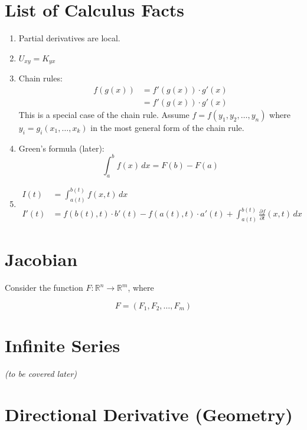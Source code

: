\documentclass[11pt]{article}
\begin{document}
\clearpage

\section*{List of Calculus Facts}

\begin{enumerate}
    \item Partial derivatives are local.
    
    \item $U_{xy} = K_{yx}$
    
    \item Chain rules:
    \begin{align*}
        f(g(x)) &= f'(g(x)) \cdot g'(x) \\
        &= f'(g(x)) \cdot g'(x)
    \end{align*}
    This is a special case of the chain rule. Assume $f = f(y_1, y_2, \ldots, y_n)$ where $y_i = g_i(x_1, \ldots, x_k)$ in the most general form of the chain rule.
    
    \item Green's formula (later):
    \[
    \int_{a}^{b} f(x) \, dx = F(b) - F(a)
    \]
    
    \item 
    \begin{align*}
        I(t) &= \int_{a(t)}^{b(t)} f(x, t) \, dx \\
        I'(t) &= f(b(t), t) \cdot b'(t) - f(a(t), t) \cdot a'(t) + \int_{a(t)}^{b(t)} \frac{\partial f}{\partial t}(x, t) \, dx
    \end{align*}
\end{enumerate}





\section*{Jacobian}

Consider the function \( F : \mathbb{R}^n \to \mathbb{R}^m \), where

\[
F = (F_1, F_2, \ldots, F_m)
\]

\section*{Infinite Series}

\emph{(to be covered later)}

\section*{Directional Derivative (Geometry)}
\end{document}
